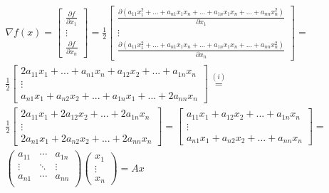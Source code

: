 \documentclass[fleqn]{article}
\begin{document}
\begin{align*}
\nabla f(x) = \begin{bmatrix} 
	\frac{\partial f}{\partial x_1 } \\ \vdots \\ \frac{\partial f}{\partial x_n }
		      \end{bmatrix}
=
\frac{1}{2}
\begin{bmatrix} 
  \frac{\partial \left(
  a_{11}x_1^2 + ... + a_{n1} x_1 x_n + ... +  a_{1n} x_1 x_n + ... + a_{nn}x_n^2
				 \right)}{\partial x_1 } \\
	    \vdots                           \\
  \frac{\partial \left(
  a_{11}x_1^2 + ... + a_{n1} x_1 x_n + ... +  a_{1n} x_1 x_n + ... + a_{nn}x_n^2
				 \right)}{\partial x_n }
\end{bmatrix}
= \\
\frac{1}{2}
\begin{bmatrix}
	2a_{11}x_1 + ... + a_{n1}x_n + a_{12}x_2 + ... +  a_{1n} x_n \\
	\vdots                                                       \\
	a_{n1} x_1 + a_{n2} x_2+ ... +  a_{1n} x_1 + ... + 2a_{nn}x_n
\end{bmatrix}
\stackrel{(i)}{=} \\
\frac{1}{2}
\begin{bmatrix}
	2a_{11}x_1 + 2a_{12}x_2 + ... + 2a_{1n}x_n \\
	\vdots                                     \\
	2a_{n1}x_1 + 2a_{n2}x_2 + ... + 2a_{nn}x_n
\end{bmatrix}
=
\begin{bmatrix}
	a_{11}x_1 + a_{12}x_2 + ... + a_{1n}x_n \\
	\vdots                                     \\
	a_{n1}x_1 + a_{n2}x_2 + ... + a_{nn}x_n
\end{bmatrix}
= \\
\begin{pmatrix} a_{11} & \cdots & a_{1n} \\
	\vdots & \ddots & \vdots \\
	a_{n1} & \cdots & a_{nn} \\	
\end{pmatrix}
\begin{pmatrix} x_1 \\ \vdots \\ x_n \end{pmatrix}
= Ax
\end{align*} \\
\end{document}
